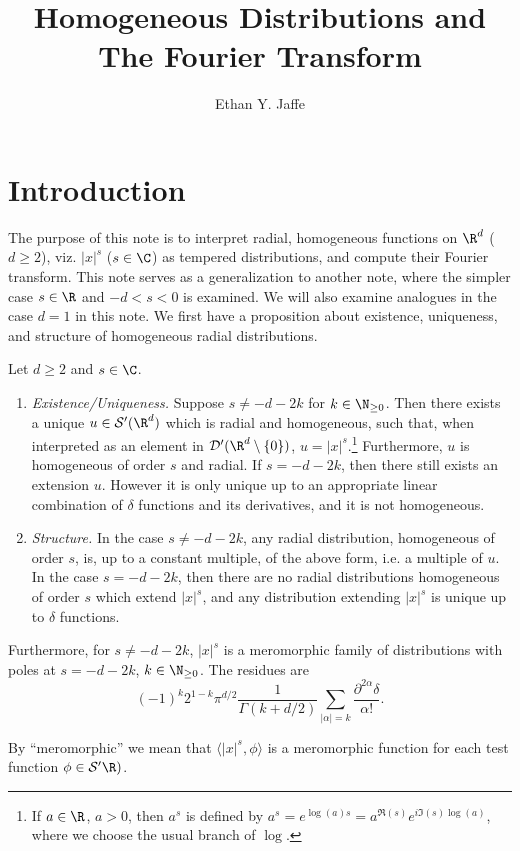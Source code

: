 \documentclass[12pt]{article}
\title{Homogeneous Distributions and The Fourier Transform}
\author{Ethan Y. Jaffe}
\date{}
\begin{document}
\maketitle
\setcounter{section}{0}
\section{Introduction}
The purpose of this note is to interpret radial, homogeneous functions on $\R^d$ ($d \geq 2$), viz. $|x|^s$ ($s \in \C$) as tempered distributions, and compute their Fourier transform. This note serves as a generalization to another note, where the simpler case $s \in \R$ and $-d < s < 0$ is examined. We will also examine analogues in the case $d=1$ in this note. We first have a proposition about existence, uniqueness, and structure of homogeneous radial distributions.
\begin{prop}\label{ext}
Let $d \geq 2$ and $s \in \C$. 
\begin{enumerate}[label =(\roman*)]
\item \emph{Existence/Uniqueness.} Suppose $s \neq -d-2k$ for $k \in \N_{\geq 0}$. Then there exists a unique $u \in \mathcal S'(\R^d)$ which is radial and homogeneous, such that, when interpreted as an element in $\mathcal D'(\R^d\setminus\{0\})$, $u = |x|^s$.\footnote{If $a \in \R$, $a > 0$, then $a^s$ is defined by $a^s = e^{\log(a)s} = a^{\Re(s)}e^{i\Im(s)\log(a)}$, where we choose the usual branch of $\log$.} Furthermore, $u$ is homogeneous of order $s$ and radial. If $s  =-d-2k$, then there still exists an extension $u$. However it is only unique up to an appropriate linear combination of $\delta$ functions and its derivatives, and it is not homogeneous.
\item \emph{Structure.} In the case $s \neq -d-2k$, any radial distribution, homogeneous of order $s$, is, up to a constant multiple, of the above form, i.e. a multiple of $u$. In the case $s = -d-2k$, then there are no radial distributions homogeneous of order $s$ which extend $|x|^s$, and any distribution extending $|x|^s$ is unique up to $\delta$ functions.
\end{enumerate}
Furthermore, for $s \neq -d-2k$, $|x|^s$ is a meromorphic family of distributions with poles at $s = -d-2k$, $k \in \N_{\geq 0}$. The residues are
\[(-1)^{k}2^{1-k}\pi^{d/2}\frac{1}{\Gamma(k+d/2)}\sum_{|\alpha| = k}\frac{\partial^{2\alpha}\delta}{\alpha!}.\]
\end{prop}
By ``meromorphic'' we mean that $\langle |x|^s,\phi\rangle$ is a meromorphic function for each test function $\phi \in \mathcal S'\R)$.
\end{document}
